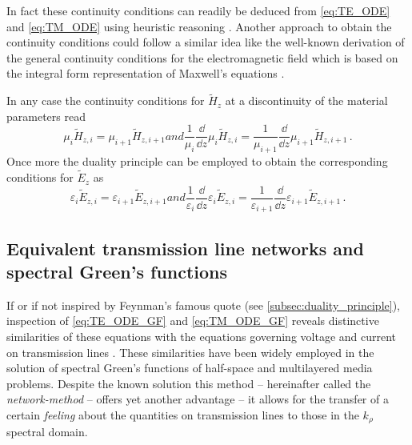 In fact these continuity conditions can readily be deduced from \eqref{eq:TE_ODE} and \eqref{eq:TM_ODE} using heuristic reasoning \cite[p.~47]{Chew1999}. Another approach to obtain the continuity conditions could follow a similar idea like the well-known derivation of the general continuity conditions for the electromagnetic field which is based on the integral form representation of Maxwell's equations \cite[pp.~20]{Jackson2013}.

In any case the continuity conditions for $\tilde{H}_z$ at a discontinuity of the material parameters read
\begin{subequations}
	\begin{equation}\label{eq:B_continuity}
		\mu_i \tilde{H}_{z,i} = \mu_{i+1} \tilde{H}_{z,i+1}
	\end{equation}
	and
	\begin{equation}\label{eq:H_z_tilde_second_continuity_condition}
		\frac{1}{\mu_i}\frac{\dd}{\dd z} \mu_i \tilde{H}_{z,i} = \frac{1}{\mu_{i+1}}\frac{\dd}{\dd z} \mu_{i+1} \tilde{H}_{z,i+1} \,.
	\end{equation}
\end{subequations}
Once more the duality principle can be employed to obtain the corresponding conditions for $\tilde{E}_z$ as
\begin{subequations}
	\begin{equation}\label{eq:D_continuity}
		\varepsilon_i \tilde{E}_{z,i} = \varepsilon_{i+1} \tilde{E}_{z,i+1}
	\end{equation}
	and
	\begin{equation}\label{eq:E_z_tilde_second_continuity_condition}
		\frac{1}{\varepsilon_i}\frac{\dd}{\dd z} \varepsilon_i \tilde{E}_{z,i} = \frac{1}{\varepsilon_{i+1}}\frac{\dd}{\dd z} \varepsilon_{i+1} \tilde{E}_{z,i+1} \,.
	\end{equation}
\end{subequations}


\subsection{Equivalent transmission line networks and spectral Green's functions}
\label{subsec:tl_greens_functions}

If or if not inspired by Feynman's famous quote (see \cref{subsec:duality_principle}), inspection of \eqref{eq:TE_ODE_GF} and \eqref{eq:TM_ODE_GF} reveals distinctive similarities of these equations with the equations governing voltage and current on transmission lines \cite[Section 2.4]{Felsen1994}. These similarities have been widely employed in the solution of spectral Green's functions of half-space and multilayered media problems. Despite the known solution this method -- hereinafter called the \emph{network-method} -- offers yet another advantage -- it allows for the transfer of a certain \emph{feeling} about the quantities on transmission lines to those in the $k_\rho$ spectral domain.

